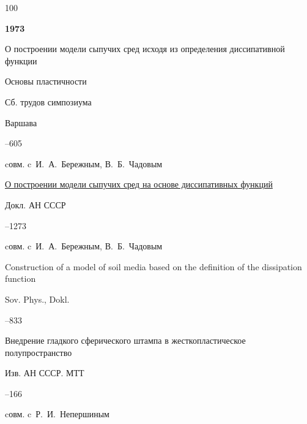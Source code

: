 \begin{thebibliography}{100}
\item[] \centerline{\bf 1973}








\paper О построении модели сыпучих сред исходя из определения диссипативной функции 

\inbook Основы пластичности

\bookinfo Сб. трудов симпозиума

\publaddr Варшава


–605 

\miscnote cовм. c~И.~А.~Бережным, В.~Б.~Чадовым




\paper \href{https://zbmath.org/?q=an:0333.73074}{О построении модели сыпучих сред на основе диссипативных функций}

\jour Докл. АН СССР




--1273

\miscnote cовм. c~И.~А.~Бережным, В.~Б.~Чадовым


\transl


\paper Construction of a model of soil media based on the definition of the dissipation function

\jour Sov. Phys., Dokl. 


--833 





\paper Внедрение гладкого сферического штампа в жесткопластическое полупространство 

\jour Изв. АН СССР. МТТ



–166 

\miscnote cовм. c~Р.~И.~Непершиным





\end{thebibliography}
